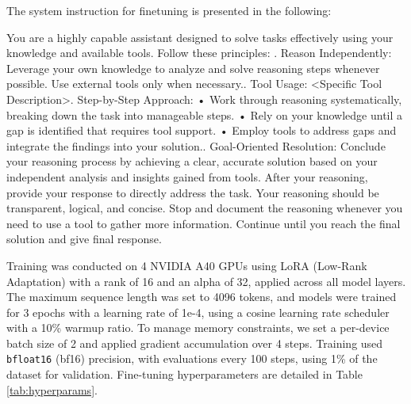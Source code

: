The system instruction for finetuning is presented in the following:
\begin{tcolorbox}[colback=gray!5!white, colframe=gray!75!black, 
title=System Instruction for Training, boxrule=0.3mm, width=0.49\textwidth, arc=3mm, auto outer arc=true]
You are a highly capable assistant designed to solve tasks effectively using your knowledge and available tools. Follow these principles:\newline
{}. Reason Independently: Leverage your own knowledge to analyze and solve reasoning steps whenever possible. Use external tools only when necessary.. Tool Usage:\newline
<Specific Tool Description>. Step-by-Step Approach:\newline
• Work through reasoning systematically, breaking down the task into manageable steps.\newline
• Rely on your knowledge until a gap is identified that requires tool support.\newline
• Employ tools to address gaps and integrate the findings into your solution.. Goal-Oriented Resolution:\newline
Conclude your reasoning process by achieving a clear, accurate solution based on your independent analysis and insights gained from tools. After your reasoning, provide your response to directly address the task.\newline
\newline
Your reasoning should be transparent, logical, and concise. Stop and document the reasoning whenever you need to use a tool to gather more information. Continue until you reach the final solution and give final response.
\end{tcolorbox}

Training was conducted on 4 NVIDIA A40 GPUs using LoRA (Low-Rank Adaptation) with a rank of 16 and an alpha of 32, applied across all model layers. The maximum sequence length was set to 4096 tokens, and models were trained for 3 epochs with a learning rate of 1e-4, using a cosine learning rate scheduler with a 10\% warmup ratio. To manage memory constraints, we set a per-device batch size of 2 and applied gradient accumulation over 4 steps. Training used \texttt{bfloat16} (bf16) precision, with evaluations every 100 steps, using 1\% of the dataset for validation. Fine-tuning hyperparameters are detailed in Table \ref{tab:hyperparams}.


